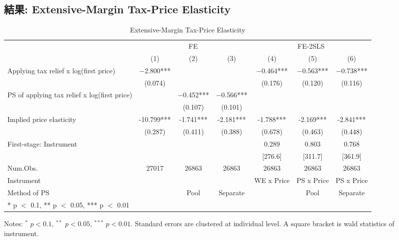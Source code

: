\documentclass[
  11pt,
  a4paper,
]{article}
\begin{document}
\hypertarget{ux7d50ux679c-extensive-margin-tax-price-elasticity}{%
\subsection{結果: Extensive-Margin Tax-Price Elasticity}\label{ux7d50ux679c-extensive-margin-tax-price-elasticity}}

\begin{table}

\caption{\label{tab:MainExtensive}Extensive-Margin Tax-Price Elasticity}
\centering
\fontsize{7}{9}\selectfont
\begin{threeparttable}
\begin{tabular}[t]{lcccccc}
\toprule
\multicolumn{1}{c}{ } & \multicolumn{3}{c}{FE} & \multicolumn{3}{c}{FE-2SLS} \\
\cmidrule(l{3pt}r{3pt}){2-4} \cmidrule(l{3pt}r{3pt}){5-7}
  & (1) & (2) & (3) & (4) & (5) & (6)\\
\midrule
Applying tax relief x log(first price) & \num{-2.800}*** &  &  & \num{-0.464}*** & \num{-0.563}*** & \num{-0.738}***\\
 & (\num{0.074}) &  &  & (\num{0.176}) & (\num{0.120}) & (\num{0.116})\\
PS of applying tax relief x log(first price) &  & \num{-0.452}*** & \num{-0.566}*** &  &  & \\
 &  & (\num{0.107}) & (\num{0.101}) &  &  & \\
\midrule
Implied price elasticity & -10.799*** & -1.741*** & -2.181*** & -1.788*** & -2.169*** & -2.841***\\
 & (0.287) & (0.411) & (0.388) & (0.678) & (0.463) & (0.448)\\
First-stage: Instrument &  &  &  & 0.289 & 0.803 & 0.768\\
 &  &  &  & {}[276.6] & {}[311.7] & {}[361.9]\\
Num.Obs. & \num{27017} & \num{26863} & \num{26863} & \num{26863} & \num{26863} & \num{26863}\\
Instrument &  &  &  & WE x Price & PS x Price & PS x Price\\
Method of PS &  & Pool & Separate &  & Pool & Separate\\
\bottomrule
\multicolumn{7}{l}{\rule{0pt}{1em}* p $<$ 0.1, ** p $<$ 0.05, *** p $<$ 0.01}\\
\end{tabular}
\begin{tablenotes}
\item Notes: $^{*}$ $p < 0.1$, $^{**}$ $p < 0.05$, $^{***}$ $p < 0.01$. Standard errors are clustered at individual level. A square bracket is wald statistics of instrument.
\end{tablenotes}
\end{threeparttable}
\end{table}
\end{document}

